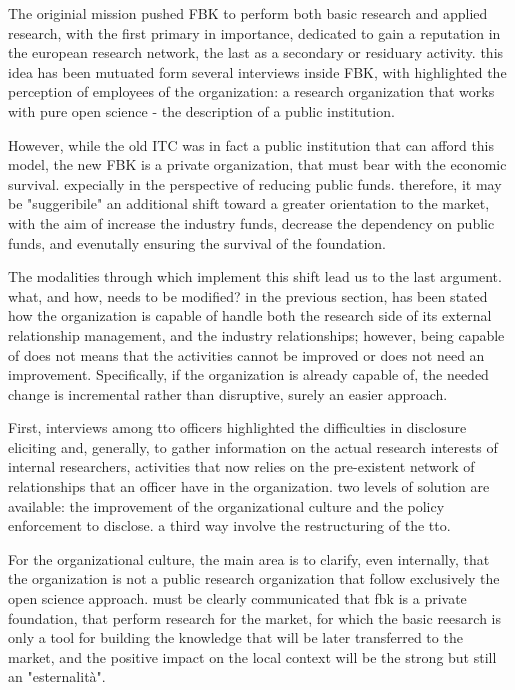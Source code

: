 The originial mission pushed FBK to perform both basic research and applied research, with the first primary in importance, dedicated to gain a reputation in the european research network, the last as a secondary or residuary activity. this idea has been mutuated form several interviews inside FBK, with highlighted the perception of employees of the organization: a research organization that works with pure open science - the description of a public institution. 

However, while the old ITC was in fact a public institution that can afford this model, the new FBK is a private organization, that must bear with the economic survival. expecially in the perspective of reducing public funds. therefore, it may be "suggeribile" an additional shift toward a greater orientation to the market, with the aim of increase the industry funds, decrease the dependency on public funds, and evenutally ensuring the survival of the foundation.

The modalities through which implement this shift lead us to the last argument. what, and how, needs to be modified? in the previous section, has been stated how the organization is capable of handle both the research side of its external relationship management, and the industry relationships; however, being capable of does not means that the activities cannot be improved or does not need an improvement. Specifically, if the organization is already capable of, the needed change is incremental rather than disruptive, surely an easier approach.

First, interviews among tto officers highlighted the difficulties in disclosure eliciting and, generally, to gather information on the actual research interests of internal researchers, activities that now relies on the pre-existent network of relationships that an officer have in the organization. two levels of solution are available: the improvement of the organizational culture and the policy enforcement to disclose. a third way involve the restructuring of the tto.

For the organizational culture, the main area is to clarify, even internally, that the organization is not a public research organization that follow exclusively the open science approach. must be clearly communicated that fbk is a private foundation, that perform research for the market, for which the basic reesarch is only a tool for building the knowledge that will be later transferred to the market, and the positive impact on the local context will be the strong but still an "esternalità". 

